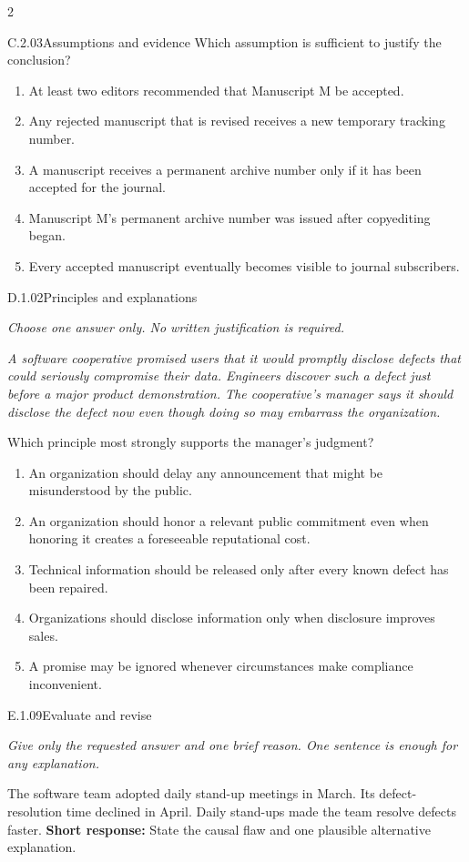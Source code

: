 \documentclass[9pt]{extarticle}
\newcommand{\choice}[1]{\item #1}
\begin{document}
\begin{multicols}{2}
\begin{DenseCoreProblem}{C.2.03}{Assumptions and evidence}
Which assumption is sufficient to justify the conclusion?
\begin{enumerate}[label=(\alph*)]
  \choice{At least two editors recommended that Manuscript M be accepted.}
  \choice{Any rejected manuscript that is revised receives a new temporary tracking number.}
  \choice{A manuscript receives a permanent archive number only if it has been accepted for the journal.}
  \choice{Manuscript M's permanent archive number was issued after copyediting began.}
  \choice{Every accepted manuscript eventually becomes visible to journal subscribers.}
\end{enumerate}
\end{DenseCoreProblem}
\begin{DenseCoreProblem}{D.1.02}{Principles and explanations}
{\scriptsize\textit{Choose one answer only. No written justification is required.}\par}
\emph{A software cooperative promised users that it would promptly disclose defects that could seriously compromise their data. Engineers discover such a defect just before a major product demonstration. The cooperative's manager says it should disclose the defect now even though doing so may embarrass the organization.}

Which principle most strongly supports the manager's judgment?
\begin{enumerate}[label=(\alph*)]
  \choice{An organization should delay any announcement that might be misunderstood by the public.}
  \choice{An organization should honor a relevant public commitment even when honoring it creates a foreseeable reputational cost.}
  \choice{Technical information should be released only after every known defect has been repaired.}
  \choice{Organizations should disclose information only when disclosure improves sales.}
  \choice{A promise may be ignored whenever circumstances make compliance inconvenient.}
\end{enumerate}
\end{DenseCoreProblem}
\begin{DenseCoreProblem}{E.1.09}{Evaluate and revise}
{\scriptsize\textit{Give only the requested answer and one brief reason. One sentence is enough for any explanation.}\par}
The software team adopted daily stand-up meetings in March. Its defect-resolution time declined in April. Daily stand-ups made the team resolve defects faster.
\textbf{Short response:} State the causal flaw and one plausible alternative explanation.
\end{DenseCoreProblem}
\end{multicols}
\end{document}
